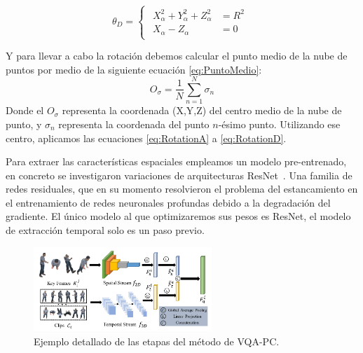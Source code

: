 \begin{equation}
  \theta_D = 
\begin{cases}
\begin{aligned}
   X_\alpha^2 + Y_\alpha^2 + Z_\alpha^2 & = R^2 \\ 
    X_\alpha - Z_\alpha & = 0 
\end{aligned}
\end{cases}
\label{eq:RotationD}
\end{equation}

Y para llevar a cabo la rotación debemos calcular el punto medio de la nube 
de puntos por medio de la siguiente ecuación \eqref{eq:PuntoMedio}:
\begin{equation}
  O_\sigma = \frac{1}{N}\sum_{n=1}^N \sigma_n
  \label{eq:PuntoMedio}
\end{equation}
Donde el $O_\sigma$ representa la coordenada (X,Y,Z) del centro medio de la 
nube de punto, y $\sigma_n$ representa la coordenada del punto $n$-ésimo punto. 
Utilizando ese centro, aplicamos las ecuaciones \eqref{eq:RotationA} a \eqref{eq:RotationD}.

Para extraer las características espaciales empleamos un modelo pre-entrenado, 
en concreto se investigaron variaciones de arquitecturas ResNet~\cite{ResNet}. Una 
familia de redes residuales, que en su momento resolvieron el problema 
del estancamiento en el entrenamiento de redes neuronales profundas debido 
a la degradación del gradiente. El único modelo al que optimizaremos sus pesos es 
ResNet, el modelo de extracción temporal solo es un paso previo.

\begin{figure}[H]
  \begin{center}
    \includegraphics[width=0.60\textwidth]{imagenes/chapter4/PipelineCompleto}
  \end{center}
  \caption{Ejemplo detallado de las etapas del método de VQA-PC.}
  \label{fig:VQAPipeline}
\end{figure}
